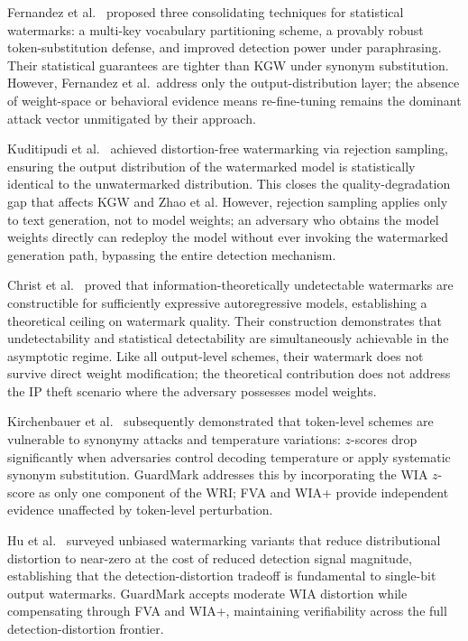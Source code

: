 \documentclass[journal,compsoc]{IEEEtran}
\begin{document}
Fernandez et al.~\cite{fernandez2023three} proposed three consolidating
techniques for statistical watermarks: a multi-key vocabulary partitioning
scheme, a provably robust token-substitution defense, and improved detection
power under paraphrasing. Their statistical guarantees are tighter than KGW
under synonym substitution. However, Fernandez et al.\ address only the
output-distribution layer; the absence of weight-space or behavioral evidence
means re-fine-tuning remains the dominant attack vector unmitigated by their
approach.

Kuditipudi et al.~\cite{kuditipudi2023robust} achieved distortion-free
watermarking via rejection sampling, ensuring the output distribution of the
watermarked model is statistically identical to the unwatermarked distribution.
This closes the quality-degradation gap that affects KGW and Zhao et al.
However, rejection sampling applies only to text generation, not to model
weights; an adversary who obtains the model weights directly can redeploy the
model without ever invoking the watermarked generation path, bypassing the
entire detection mechanism.

Christ et al.~\cite{christ2024undetectable} proved that information-theoretically
undetectable watermarks are constructible for sufficiently expressive autoregressive
models, establishing a theoretical ceiling on watermark quality. Their construction
demonstrates that undetectability and statistical detectability are simultaneously
achievable in the asymptotic regime. Like all output-level schemes, their
watermark does not survive direct weight modification; the theoretical
contribution does not address the IP theft scenario where the adversary possesses
model weights.

Kirchenbauer et al.~\cite{kirchenbauer2024reliability} subsequently demonstrated
that token-level schemes are vulnerable to synonymy attacks and temperature
variations: $z$-scores drop significantly when adversaries control decoding
temperature or apply systematic synonym substitution. GuardMark addresses this
by incorporating the WIA $z$-score as only one component of the WRI; FVA and
WIA+ provide independent evidence unaffected by token-level perturbation.

Hu et al.~\cite{hu2023survey} surveyed unbiased watermarking variants that
reduce distributional distortion to near-zero at the cost of reduced detection
signal magnitude, establishing that the detection-distortion tradeoff is
fundamental to single-bit output watermarks. GuardMark accepts moderate WIA
distortion while compensating through FVA and WIA+, maintaining verifiability
across the full detection-distortion frontier.
\end{document}
